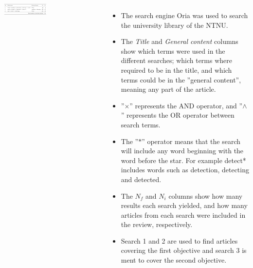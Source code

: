 \documentclass[18pt, a3paper, portrait]{tikzposter}
\begin{document}
\begin{columns}
    {
        \begin{tikzfigure}
            \includegraphics[width=0.45\textwidth]{images/search_terms_table.png}
        \end{tikzfigure}
    }
 
    {
        \begin{itemize}
            \item The search engine Oria was used to search the university library of the NTNU.
            \item The \textit{Title} and \textit{General content} columns show which terms were used in the different searches; which terms where required to be in the title, and which terms could be in the ”general content”, meaning any part of the article.
            \item ''$\times$'' represents the AND operator, and ''$\wedge$'' represents the OR operator between search terms.
            \item The ''$*$'' operator means that the search will include any word beginning with the word before the star. For example detect* includes words such as detection, detecting and detected.
            \item The $N_f$ and $N_i$ columns show how many results each search yielded, and how many articles from each search were included in the review, respectively.
            \item Search 1 and 2 are used to find articles covering the first objective and search 3 is ment to cover the second objective.
        \end{itemize}
    }
\end{columns}
\end{document}
